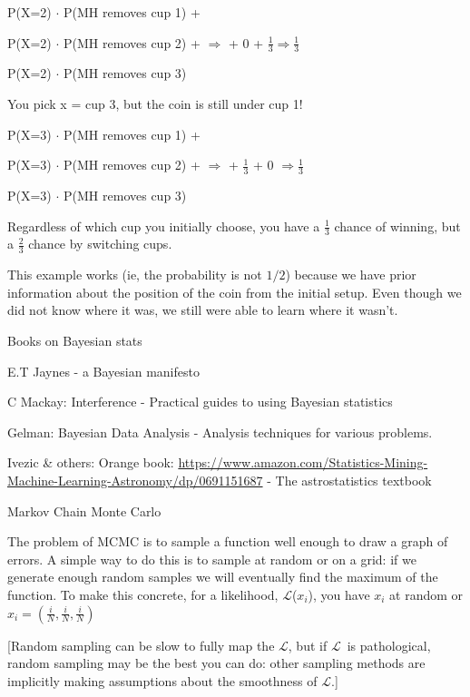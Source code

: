 \documentclass[12pt, oneside,fullpage]{article}
\newcommand{\Lc}{$\mathcal{L}$}
\begin{document}
P(X=2) $\cdot$ P(MH removes cup 1) +

P(X=2) $\cdot$ P(MH removes cup 2) + \indent  $\Rightarrow$  + 0 + $\frac{1}{3} \Rightarrow \frac{1}{3}$

P(X=2) $\cdot$ P(MH removes cup 3)

\bigskip

\noindent You pick x = cup 3, but the coin is still under cup 1!

P(X=3) $\cdot$ P(MH removes cup 1) +

P(X=3) $\cdot$ P(MH removes cup 2) + \indent  $\Rightarrow$  + $\frac{1}{3}$ + 0 $\Rightarrow \frac{1}{3}$

P(X=3) $\cdot$ P(MH removes cup 3)


\noindent Regardless of which cup you initially choose, you have a $\frac{1}{3}$ chance of winning, but a $\frac{2}{3}$ chance by switching cups.

This example works (ie, the probability is not $1/2$) because we have prior information about the position of the coin from the initial setup. Even though we did not know where it was, we still were able to learn where it wasn't.

\bigskip

\noindent Books on Bayesian stats

E.T Jaynes - a Bayesian manifesto

C Mackay: Interference - Practical guides to using Bayesian statistics

Gelman: Bayesian Data Analysis - Analysis techniques for various problems.

Ivezic \& others: Orange book: \url{https://www.amazon.com/Statistics-Mining-Machine-Learning-Astronomy/dp/0691151687} - The astrostatistics textbook

\bigskip

\begin{center}
	\LARGE{Markov Chain Monte Carlo}
\end{center}

The problem of MCMC is to sample a function well enough to draw a graph of errors. A simple way to do this is to sample at random or on a grid: if we generate enough random samples we will eventually find the maximum of the function. To make this concrete, for a likelihood, \Lc($x_{i}$), you have $x_{i}$ at random or $x_{i} = (\frac{i}{N}, \frac{i}{N}, \frac{i}{N})$

[Random sampling can be slow to fully map the \Lc, but if \Lc\ is pathological, random sampling may be the best you can do: other sampling methods are implicitly making assumptions about the smoothness of \Lc.]
\end{document}
